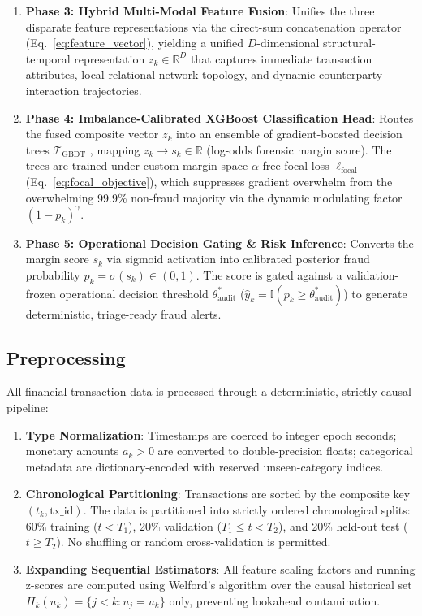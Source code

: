 \documentclass[journal]{IEEEtran}
\begin{document}
\begin{enumerate}
\begin{itemize}
    \end{itemize}
    \item \textbf{Phase 3: Hybrid Multi-Modal Feature Fusion}: Unifies the three disparate feature representations via the direct-sum concatenation operator (Eq.~\ref{eq:feature_vector}), yielding a unified $D$-dimensional structural-temporal representation $z_k \in \mathbb{R}^D$ that captures immediate transaction attributes, local relational network topology, and dynamic counterparty interaction trajectories.
    \item \textbf{Phase 4: Imbalance-Calibrated XGBoost Classification Head}: Routes the fused composite vector $z_k$ into an ensemble of gradient-boosted decision trees $\mathcal{T}_{\text{GBDT}}$ \cite{chen2016xgboost}, mapping $z_k \to s_k \in \mathbb{R}$ (log-odds forensic margin score). The trees are trained under custom margin-space $\alpha$-free focal loss $\ell_{\text{focal}}$ (Eq.~\ref{eq:focal_objective}), which suppresses gradient overwhelm from the overwhelming 99.9\% non-fraud majority via the dynamic modulating factor $(1 - p_k)^\gamma$.
    \item \textbf{Phase 5: Operational Decision Gating \& Risk Inference}: Converts the margin score $s_k$ via sigmoid activation into calibrated posterior fraud probability $p_k = \sigma(s_k) \in (0, 1)$. The score is gated against a validation-frozen operational decision threshold $\theta_{\text{audit}}^*$ ($\hat{y}_k = \mathbb{I}(p_k \ge \theta_{\text{audit}}^*)$) to generate deterministic, triage-ready fraud alerts.
\end{enumerate}

\subsection{Preprocessing}\label{sec:model_preproc}
All financial transaction data is processed through a deterministic, strictly causal pipeline:
\begin{enumerate}
    \item \textbf{Type Normalization}: Timestamps are coerced to integer epoch seconds; monetary amounts $a_k > 0$ are converted to double-precision floats; categorical metadata are dictionary-encoded with reserved unseen-category indices.
    \item \textbf{Chronological Partitioning}: Transactions are sorted by the composite key $(t_k, \text{tx\_id})$. The data is partitioned into strictly ordered chronological splits: 60\% training ($t < T_1$), 20\% validation ($T_1 \le t < T_2$), and 20\% held-out test ($t \ge T_2$). No shuffling or random cross-validation is permitted.
    \item \textbf{Expanding Sequential Estimators}: All feature scaling factors and running z-scores are computed using Welford's algorithm \cite{welford1962note} over the causal historical set $H_k(u_k) = \{j < k : u_j = u_k\}$ only, preventing lookahead contamination.
\end{enumerate}
\end{document}
